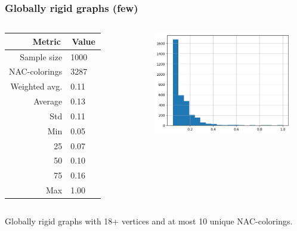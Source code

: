\documentclass{beamer}
\begin{document}
\begin{frame}
	\frametitle{Globally rigid graphs (few)}

	\begin{columns}

		\begin{table}[ht]
			\centering
			\begin{tabular}{r|l}
				\toprule
				\,Metric\,    & \,Value\, \\
				\midrule
				Sample size   & 1000      \\
				NAC-colorings & 3287      \\
				Weighted avg. & 0.11      \\
				Average       & 0.13      \\
				Std           & 0.11      \\
				Min           & 0.05      \\
				25            & 0.07      \\
				50            & 0.10      \\
				75            & 0.16      \\
				Max           & 1.00      \\
				\bottomrule
			\end{tabular}
		\end{table}


		\includegraphics[width=0.9\textwidth]{./assets/presentation_reviewer_globally_rigid_few.png}

	\end{columns}

	\centering
	Globally rigid graphs with 18+ vertices and at most 10 unique NAC-colorings.
\end{frame}
\end{document}
